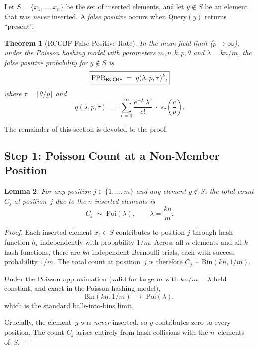\documentclass[11pt,a4paper]{article}
\newtheorem{theorem}{Theorem}[section]
\newtheorem{lemma}[theorem]{Lemma}
\newcommand{\RCCBF}{\textsf{RCCBF}}
\newcommand{\FPR}{\mathrm{FPR}}
\newcommand{\Poi}{\mathrm{Poi}}
\begin{document}
Let $S = \{x_1, \ldots, x_n\}$ be the set of inserted elements, and let
$y \notin S$ be an element that was \emph{never} inserted.  A
\emph{false positive} occurs when $\mathrm{Query}(y)$ returns ``present''.

\begin{theorem}[RCCBF False Positive Rate]\label{thm:fpr-rccbf}
In the mean-field limit ($p \to \infty$), under the Poisson hashing model
with parameters $m, n, k, p, \theta$ and $\lambda = kn/m$, the false
positive probability for $y \notin S$ is
\begin{equation}\label{eq:fpr-rccbf}
  \boxed{%
  \FPR_{\RCCBF}
  \;=\; q(\lambda, p, \tau)^{k},}
\end{equation}
where $\tau = \lceil \theta / p \rceil$ and
\begin{equation}\label{eq:q-def}
  q(\lambda, p, \tau)
  \;=\; \sum_{c=0}^{\infty}
        \frac{e^{-\lambda}\,\lambda^c}{c!}\;\cdot\;
        s_\tau\!\left(\frac{c}{p}\right).
\end{equation}
\end{theorem}

The remainder of this section is devoted to the proof.

\subsection{Step 1: Poisson Count at a Non-Member Position}
\label{ssec:fpr-step1}

\begin{lemma}\label{lem:poisson-count}
For any position $j \in \{1, \ldots, m\}$ and any element $y \notin S$,
the total count $C_j$ at position~$j$ due to the $n$ inserted elements is
\begin{equation}\label{eq:poisson-count}
  C_j \;\sim\; \Poi(\lambda), \qquad \lambda = \frac{kn}{m}.
\end{equation}
\end{lemma}

\begin{proof}
Each inserted element $x_\ell \in S$ contributes to position $j$ through
hash function $h_i$ independently with probability $1/m$.  Across all $n$
elements and all $k$ hash functions, there are $kn$ independent Bernoulli
trials, each with success probability $1/m$.  The total count at
position~$j$ is therefore $C_j \sim \mathrm{Bin}(kn, 1/m)$.

Under the Poisson approximation (valid for large $m$ with $kn/m = \lambda$
held constant, and exact in the Poisson hashing model),
\begin{equation}\label{eq:bin-to-poi}
  \mathrm{Bin}(kn, 1/m) \;\to\; \Poi(\lambda),
\end{equation}
which is the standard balls-into-bins limit.

Crucially, the element~$y$ was \emph{never} inserted, so $y$ contributes
zero to every position.  The count $C_j$ arises entirely from hash
collisions with the $n$~elements of~$S$.
\end{proof}
\end{document}
